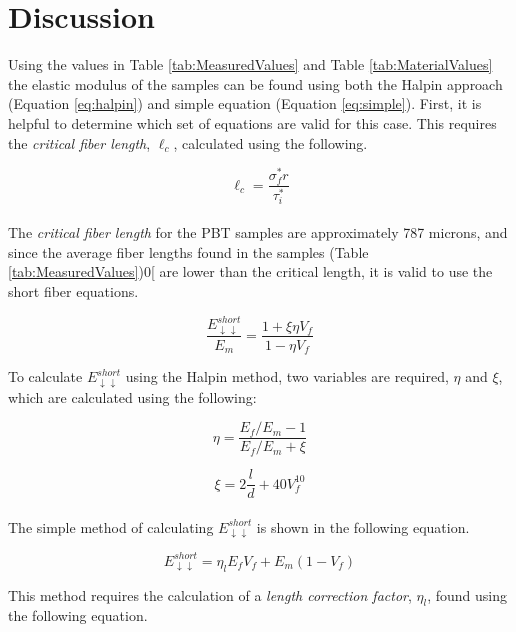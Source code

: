 \documentclass[11pt]{article}
\begin{document}
\section{Discussion}


Using the values in Table \ref{tab:MeasuredValues} and Table \ref{tab:MaterialValues} the elastic modulus of the samples can be found using both the Halpin approach (Equation \ref{eq:halpin}) and simple equation (Equation \ref{eq:simple}). First, it is helpful to determine which set of equations are valid for this case. This requires the \textit{critical fiber length}, \(\ell_c\), calculated using the following.

\begin{equation}
\ell_c = \frac{\sigma^*_f r}{\tau^*_i}
\end{equation}
\\

The \textit{critical fiber length} for the PBT samples are approximately 787 microns, and since the average fiber lengths found in the samples (Table \ref{tab:MeasuredValues})0[ are lower than the critical length, it is valid to use the short fiber equations.

\begin{equation} \label{eq:halpin}
\frac{E^{short}_{\downarrow \downarrow}}{E_m} = \frac{1+\xi \eta V_f}{1-\eta V_f}
\end{equation}

To calculate \(E_{\downarrow \downarrow}^{short}\) using the Halpin method, two variables are required, \(\eta\) and \(\xi\), which are calculated using the following:

\begin{equation}
\eta = \frac{E_f/E_m-1}{E_f/E_m+\xi}
\end{equation}

\begin{equation}
\xi = 2 \frac{l}{d} +40V^{10}_f
\end{equation}
\\
The simple method of calculating \(E_{\downarrow \downarrow}^{short}\) is shown in the following equation.

\begin{equation} \label{eq:simple}
E^{short}_{\downarrow \downarrow} = \eta_l E_f V_f + E_m(1-V_f)
\end{equation}

This method requires the calculation of a \textit{length correction factor}, \(\eta_l\), found using the following equation.
\end{document}

